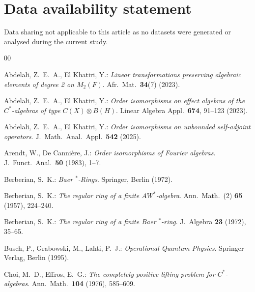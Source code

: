 \documentclass[12pt]{amsart}
\theoremstyle{definition}
\theoremstyle{remark}
\numberwithin{equation}{section}
\begin{document}
\section*{Data availability statement }

Data sharing not applicable to this article as no datasets  were generated  or analysed during the current study.
























\begin{thebibliography}{00}
	
	Abdelali, Z.\ E.\ A., El Khatiri, Y.: \textit{Linear transformations preserving algebraic elements of degree 2 on $M_{2}(F)$}. Afr.\ Mat.\ \textbf{34}(7) (2023).
	
	Abdelali, Z.\ E.\ A., El Khatiri, Y.: \textit{Order isomorphisms on effect algebras of the $C^{*}$-algebras of type $C(X)\otimes B(H)$}. Linear Algebra Appl.\ \textbf{674}, 91--123 (2023).
	
	Abdelali, Z.\ E.\ A., El Khatiri, Y.: \textit{Order isomorphisms on unbounded self-adjoint operators}. J.\ Math.\ Anal.\ Appl.\ \textbf{542} (2025).
	
	Arendt, W., De Cannière, J.: \textit{Order isomorphisms of Fourier algebras}. J.\ Funct.\ Anal.\ \textbf{50} (1983), 1--7.
	
	Berberian, S.\ K.: \textit{Baer $^{*}$-Rings}. Springer, Berlin (1972).
	
	Berberian, S.\ K.: \textit{The regular ring of a finite $AW^{*}$-algebra}. Ann.\ Math.\ (2) \textbf{65} (1957), 224--240.
	
	Berberian, S.\ K.: \textit{The regular ring of a finite Baer $^{*}$-ring}. J.\ Algebra \textbf{23} (1972), 35--65. 
	
	Busch, P., Grabowski, M., Lahti, P.\ J.: \textit{Operational Quantum Physics}. Springer-Verlag, Berlin (1995).
	
	Choi, M.\ D., Effros, E.\ G.: \textit{The completely positive lifting problem for $C^{*}$-algebras}. Ann.\ Math.\ \textbf{104} (1976), 585--609.
	

\end{thebibliography}
\end{document}
